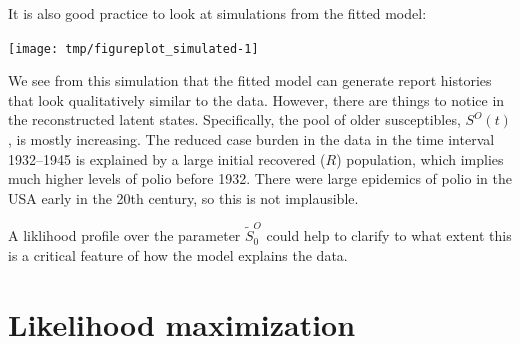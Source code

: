 \begin{frame}[fragile]

\bi
\item It is also good practice to look at simulations from the fitted model:

\ei

\begin{knitrout}\small
{}\color{fgcolor}\begin{kframe}
\begin{alltt}
 \hlkwb{<-} \hlstd{=}\hlstd{)}
\end{alltt}
\end{kframe}

{\centering \texttt{[image: tmp/figureplot\_simulated-1]} 

}



\end{knitrout}

\end{frame}

\begin{frame}[fragile]

\bi

\item We see from this simulation that the fitted model can generate report histories that look qualitatively similar to the data. However, there are things to notice in the reconstructed latent states. Specifically, the pool of older susceptibles, $S^O(t)$, is mostly increasing. The reduced case burden in the data in the time interval 1932--1945 is explained by a large initial recovered ($R$) population, which implies much higher levels of polio before 1932. There were large epidemics of polio in the USA early in the 20th century, so this is not implausible.

\item A liklihood profile over the parameter $\tilde S^O_0$ could help to clarify to what extent this is a critical feature of how the model explains the data.

\ei

\end{frame}

\section{Likelihood maximization}

